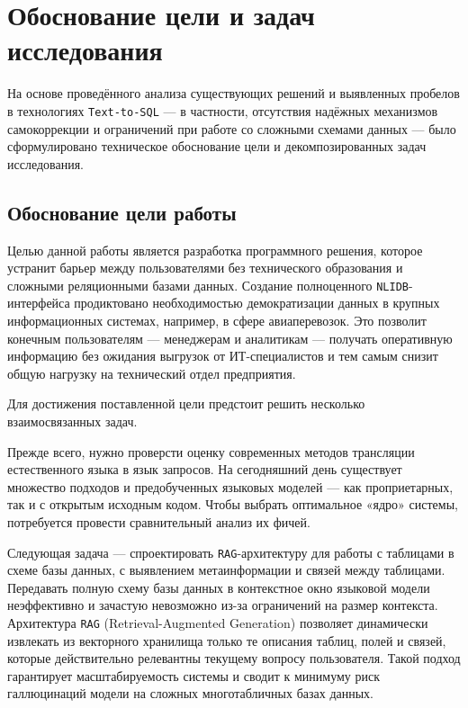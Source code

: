 \section{Обоснование цели и задач исследования}

На основе проведённого анализа существующих решений и выявленных пробелов в технологиях \texttt{Text-to-SQL} — в частности, отсутствия надёжных механизмов самокоррекции и ограничений при работе со сложными схемами данных — было сформулировано техническое обоснование цели и декомпозированных задач исследования.

\subsection{Обоснование цели работы}

Целью данной работы является разработка программного решения, которое устранит барьер между пользователями без технического образования и сложными реляционными базами данных. Создание полноценного \texttt{NLIDB}-интерфейса продиктовано необходимостью демократизации данных в крупных информационных системах, например, в сфере авиаперевозок. Это позволит конечным пользователям — менеджерам и аналитикам — получать оперативную информацию без ожидания выгрузок от ИТ-специалистов и тем самым снизит общую нагрузку на технический отдел предприятия.

Для достижения поставленной цели предстоит решить несколько взаимосвязанных задач.

Прежде всего, нужно проверсти оценку современных методов трансляции естественного языка в язык запросов. На сегодняшний день существует множество подходов и предобученных языковых моделей — как проприетарных, так и с открытым исходным кодом. Чтобы выбрать оптимальное «ядро» системы, потребуется провести сравнительный анализ их фичей.

Следующая задача — спроектировать \texttt{RAG}-архитектуру для работы с таблицами в схеме базы данных, с выявлением метаинформации и связей между таблицами. Передавать полную схему базы данных в контекстное окно языковой модели неэффективно и зачастую невозможно из-за ограничений на размер контекста. Архитектура \texttt{RAG} (Retrieval-Augmented Generation) позволяет динамически извлекать из векторного хранилища только те описания таблиц, полей и связей, которые действительно релевантны текущему вопросу пользователя. Такой подход гарантирует масштабируемость системы и сводит к минимуму риск галлюцинаций модели на сложных многотабличных базах данных.

